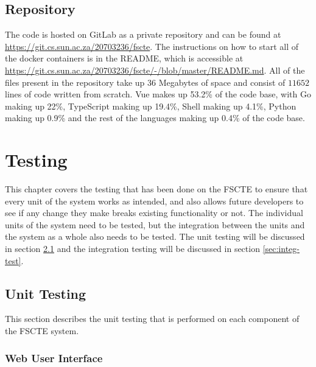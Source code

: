 \documentclass[a4paper, 11pt]{report}
\begin{document}
\section{Repository}

The code is hosted on GitLab as a private repository and can be found at
\url{https://git.cs.sun.ac.za/20703236/fscte}. The instructions on how to start
all of the docker containers is in the README, which is accessible at
\url{https://git.cs.sun.ac.za/20703236/fscte/-/blob/master/README.md}. All of
the files present in the repository take up 36 Megabytes of space and consist
of $11 652$ lines of code written from scratch. Vue makes up 53.2\% of the code
base, with Go making up 22\%, TypeScript making up 19.4\%, Shell making up 4.1\%,
Python making up 0.9\% and the rest of the languages making up 0.4\% of the code
base.

\chapter{Testing}
\label{chap:testing}

This chapter covers the testing that has been done on the FSCTE to ensure that
every unit of the system works as intended, and also allows future developers to
see if any change they make breaks existing functionality or not. The individual
units of the system need to be tested, but the integration between the units and
the system as a whole also needs to be tested. The unit testing will be discussed
in section \ref{sec:unit-test} and the integration testing will be discussed in
section \ref{sec:integ-test}.

\section{Unit Testing}
\label{sec:unit-test}

This section describes the unit testing that is performed on each component of
the FSCTE system.

\subsection{Web User Interface}
\end{document}
